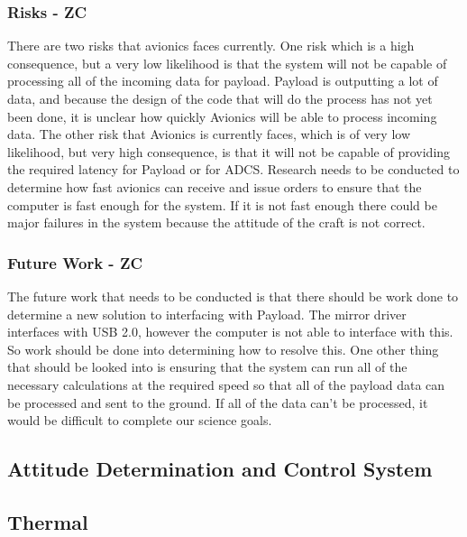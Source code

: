 \documentclass[12pt]{article}
\begin{document}
			\subsubsection{Risks - ZC}
There are two risks that avionics faces currently. One risk which is a high consequence, but a very low likelihood is that the system will not be capable of processing all of the incoming data for payload. Payload is outputting a lot of data, and because the design of the code that will do the process has not yet been done, it is unclear how quickly Avionics will be able to process incoming data. The other risk that Avionics is currently faces, which is of very low likelihood, but very high consequence, is that it will not be capable of providing the required latency for Payload or for ADCS. Research needs to be conducted to determine how fast avionics can receive and issue orders to ensure that the computer is fast enough for the system. If it is not fast enough there could be major failures in the system because the attitude of the craft is not correct.

			\subsubsection{Future Work - ZC}
The future work that needs to be conducted is that there should be work done to determine a new solution to interfacing with Payload. The mirror driver interfaces with USB 2.0, however the computer is not able to interface with this. So work should be done into determining how to resolve this. One other thing that should be looked into is ensuring that the system can run all of the necessary calculations at the required speed so that all of the payload data can be processed and sent to the ground. If all of the data can’t be processed, it would be difficult to complete our science goals.


		\subsection{Attitude Determination and Control System}


		\subsection{Thermal}
\end{document}
